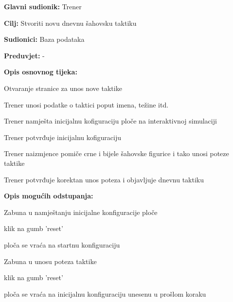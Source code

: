 					\noindent {}
					\begin{packed_item}
	
						\item \textbf{Glavni sudionik: }Trener
						\item  \textbf{Cilj: } Stvoriti novu dnevnu šahovsku taktiku
						\item  \textbf{Sudionici: } Baza podataka
						\item  \textbf{Preduvjet: } -
						\item  \textbf{Opis osnovnog tijeka:}
						
						\item[] \begin{packed_enum}
	
							\item Otvaranje stranice za unos nove taktike
							\item Trener unosi podatke o taktici poput imena, težine itd.
							\item Trener namješta inicijalnu kofiguraciju ploče na interaktivnoj simulaciji
							\item Trener potvrđuje inicijalnu kofiguraciju
							\item Trener naizmjence pomiče crne i bijele šahovske figurice i tako unosi poteze taktike
							\item Trener potvrđuje korektan unos poteza i objavljuje dnevnu taktiku
							
						\end{packed_enum}
						
						\item  \textbf{Opis mogućih odstupanja:}
						
						\item[] \begin{packed_item}
	
							\item Zabuna u namještanju inicijalne konfiguracije ploče
							\item[] \begin{packed_enum}
								
								\item klik na gumb 'reset'
								\item ploča se vraća na startnu konfiguraciju
								
							\end{packed_enum}
							
							\item Zabuna u unosu poteza taktike
							\item[] \begin{packed_enum}
								
								\item klik na gumb 'reset'
								\item ploča se vraća na inicijalnu konfiguraciju unesenu u prošlom koraku
								
							\end{packed_enum}
							
						\end{packed_item}
					\end{packed_item}
					
